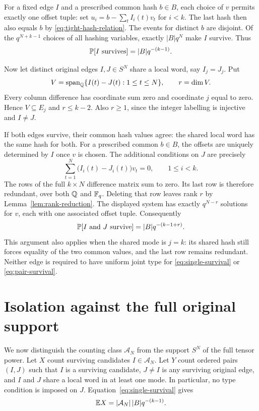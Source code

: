 For a fixed edge $I$ and a prescribed common hash $b\in B$, each
choice of $v$ permits exactly one offset tuple: set
$u_i=b-\sum_t I_i(t)v_t$ for $i<k$. The last hash then also equals
$b$ by \eqref{eq:tight-hash-relation}. The events for distinct $b$
are disjoint. Of the $q^{N+k-1}$ choices of all hashing variables,
exactly $|B|q^N$ make $I$ survive. Thus
\begin{equation}
 \mathbb P[I\text{ survives}]=|B|q^{-(k-1)}.
 \label{eq:single-survival}
\end{equation}

Now let distinct original edges $I,J\in S^N$ share a local word,
say $I_j=J_j$. Put
\[
 V=\operatorname{span}_{\mathbb Q}
       \{I(t)-J(t):1\leq t\leq N\},
 \qquad r=\dim V.
\]
Every column difference has coordinate sum zero and coordinate $j$
equal to zero. Hence $V\subseteq E_j$ and $r\leq k-2$. Also
$r\geq 1$, since the integer labelling is injective and $I\ne J$.

If both edges survive, their common hash values agree: the shared
local word has the same hash for both. For a prescribed common
$b\in B$, the offsets are uniquely determined by $I$ once $v$ is
chosen. The additional conditions on $J$ are precisely
\[
 \sum_{t=1}^N\bigl(I_i(t)-J_i(t)\bigr)v_t=0,
 \qquad 1\leq i<k.
\]
The rows of the full $k\times N$ difference matrix sum to zero.
Its last row is therefore redundant, over both $\mathbb Q$ and $\mathbb F_q$.
Deleting that row leaves rank $r$ by
Lemma~\ref{lem:rank-reduction}. The displayed system has exactly
$q^{N-r}$ solutions for $v$, each with one associated offset tuple.
Consequently
\begin{equation}
 \mathbb P[I\text{ and }J\text{ survive}]
       =|B|q^{-(k-1+r)}.
 \label{eq:pair-survival}
\end{equation}
This argument also applies when the shared mode is $j=k$: its
shared hash still forces equality of the two common values, and
the last row remains redundant. Neither edge is required to have
uniform joint type for \eqref{eq:single-survival} or
\eqref{eq:pair-survival}.

\section{Isolation against the full original support}
\label{sec:isolation}

We now distinguish the counting class $\mathcal A_N$ from the
support $S^N$ of the full tensor power. Let $X$ count surviving
candidates $I\in\mathcal A_N$. Let $Y$ count ordered pairs $(I,J)$
such that $I$ is a surviving candidate, $J\ne I$ is any surviving
original edge, and $I$ and $J$ share a local word in at least one
mode. In particular, no type condition is imposed on $J$.
Equation~\eqref{eq:single-survival} gives
\begin{equation}
 \mathbb E X=|\mathcal A_N|\,|B|q^{-(k-1)}.
 \label{eq:candidate-expectation}
\end{equation}

